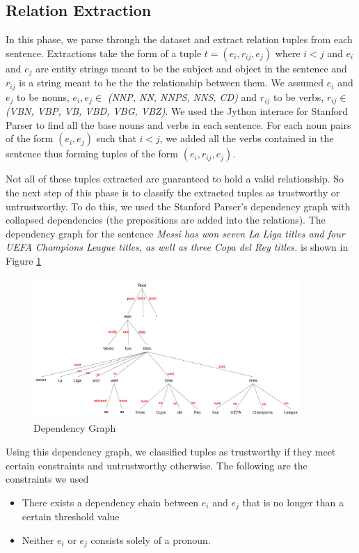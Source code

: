 \documentclass{article}
\begin{document}
\subsection{Relation Extraction}
In this phase, we parse through the dataset and extract relation tuples from each sentence. Extractions take the form of a tuple $t = (e_i, r_{ij}, e_j)$ where $i < j$ and $e_i$ and $e_j$ are entity strings meant to be the subject and object in the sentence and $r_{ij}$ is a string meant to be the the relationship between them. 
We assumed $e_i$ and $e_j$ to be nouns, $e_i, e_j \in $ \textit{(NNP, NN, NNPS, NNS, CD)} and $r_{ij}$ to be verbs, $r_{ij} \in$  \textit{(VBN, VBP, VB, VBD, VBG, VBZ)}. We used the Jython interace for Stanford Parser \cite{jython} to find all the base nouns and verbs in each sentence. For each noun pairs of the form $(e_i, e_j)$ such that $i<j$, we added all the verbs contained in the sentence thus forming tuples of the form $(e_i, r_{ij}, e_j)$.

Not all of these tuples extracted are guaranteed to hold a valid relationship. So the next step of this phase is to classify the extracted tuples as trustworthy or untrustworthy. To do this, we used the Stanford Parser's dependency graph with collapsed dependencies (the prepositions are added into the relations). The dependency graph for the sentence \textit{Messi has won seven La Liga titles and four UEFA Champions League titles, as well as three Copa del Rey titles.} is shown in Figure \ref{fig:dep}

\begin{figure}[H]
\centering
\includegraphics[width=0.9\textwidth]{tree.png}
\caption{Dependency Graph}
\label{fig:dep}
\end{figure}

Using this dependency graph, we classified tuples as trustworthy if they meet certain constraints and untrustworthy otherwise. The following are the constraints we used
\begin{itemize}
\setlength\itemsep{0.05 em}
\item There exists a dependency chain between $e_i$ and $e_j$ that is no longer than a certain threshold value
\item Neither $e_i$ or $e_j$ consists solely of a pronoun.
\end{itemize}
\end{document}
